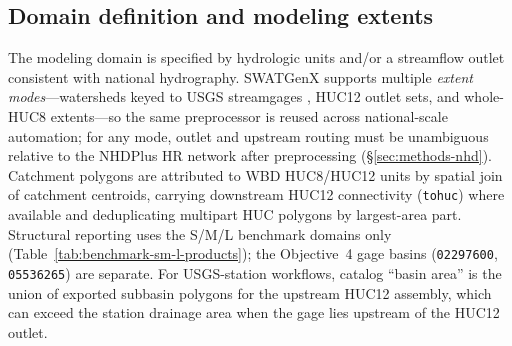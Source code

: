 \subsection{Domain definition and modeling extents}
\label{sec:methods-domain}

The modeling domain is specified by hydrologic units and/or a streamflow outlet consistent with national hydrography. SWATGenX supports multiple \emph{extent modes}---watersheds keyed to USGS streamgages \citep{USGSNWIS}, HUC12 outlet sets, and whole-HUC8 extents---so the same preprocessor is reused across national-scale automation; for any mode, outlet and upstream routing must be unambiguous relative to the NHDPlus HR network after preprocessing (\S\ref{sec:methods-nhd}). Catchment polygons are attributed to WBD HUC8/HUC12 units by spatial join of catchment centroids, carrying downstream HUC12 connectivity (\texttt{tohuc}) where available and deduplicating multipart HUC polygons by largest-area part. Structural reporting uses the S/M/L benchmark domains only (Table~\ref{tab:benchmark-sm-l-products}); the Objective~4 gage basins (\texttt{02297600}, \texttt{05536265}) are separate. For USGS-station workflows, catalog ``basin area'' is the union of exported subbasin polygons for the upstream HUC12 assembly, which can exceed the station drainage area when the gage lies upstream of the HUC12 outlet.

